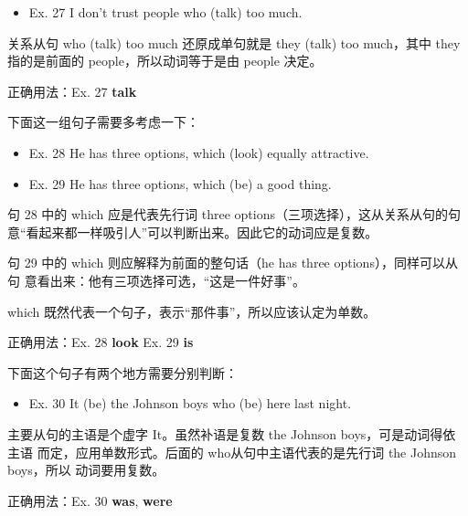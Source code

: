 \documentclass{yufa}
\begin{document}
\begin{mybox}

  \begin{itemize}
  \item   Ex. 27 I don't trust people who (talk) too much.
  \end{itemize}

  关系从句 who (talk) too much 还原成单句就是 they (talk) too much，其中
  they 指的是前面的 people，所以动词等于是由 people 决定。

  \tcblower

  正确用法：Ex. 27 \textbf{talk}
\end{mybox}

下面这一组句子需要多考虑一下：
\begin{mybox}

  \begin{itemize}
  \item   Ex. 28 He has three options, which (look) equally attractive.
  \item   Ex. 29 He has three options, which (be) a good thing.
  \end{itemize}

  句 28 中的 which 应是代表先行词 three options（三项选择），这从关系从句的句
  意“看起来都一样吸引人”可以判断出来。因此它的动词应是复数。

  句 29 中的 which 则应解释为前面的整句话（he has three options），同样可以从句
  意看出来：他有三项选择可选，“这是一件好事”。

  which 既然代表一个句子，表示“那件事”，所以应该认定为单数。

  \tcblower

  正确用法：Ex. 28 \textbf{look} \qquad\quad Ex. 29 \textbf{is}
\end{mybox}

下面这个句子有两个地方需要分别判断：

\begin{mybox}

  \begin{itemize}
  \item   Ex. 30 It (be) the Johnson boys who (be) here last night.
  \end{itemize}

  主要从句的主语是个虚字 It。虽然补语是复数 the Johnson boys，可是动词得依主语
  而定，应用单数形式。后面的 who从句中主语代表的是先行词 the Johnson boys，所以
  动词要用复数。

  \tcblower

  正确用法：Ex. 30 \textbf{was}, \textbf{were}
\end{mybox}
\end{document}
